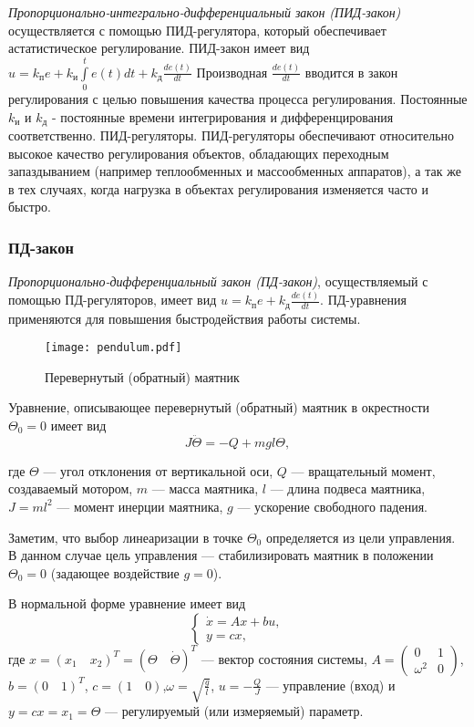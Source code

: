 \documentclass[TAU.tex]{subfiles}
\begin{document}
{\it Пропорционально-интегрально-дифференциальный закон (ПИД-закон)} осуществляется с помощью ПИД-регулятора, который обеспечивает астатистическое регулирование. ПИД-закон имеет вид $u=k_\text{п}e+ k_\text{и}\int\limits_0^t e(t) dt +k_\text{д} \frac{de(t)}{dt}$ Производная $\frac{d e(t)}{dt}$ вводится в закон регулирования с целью повышения качества процесса регулирования. Постоянные $k_\text{и}$ и $k_\text{д}$ - постоянные времени интегрирования и дифференцирования соответственно. ПИД-регуляторы.
ПИД-регуляторы обеспечивают относительно высокое качество регулирования объектов, обладающих переходным запаздыванием (например теплообменных и массообменных аппаратов), а так же в тех случаях, когда нагрузка в объектах регулирования изменяется часто и быстро.


\subsubsection{ПД-закон}

{\it Пропорционально-дифференциальный закон (ПД-закон)}, осуществляемый с помощью ПД-регуляторов, имеет вид $u=k_\text{п}e+ k_\text{д} \frac{de(t)}{dt}$. ПД-уравнения применяются для повышения быстродействия работы системы.

\begin{figure}[h]
\centering
\texttt{[image: pendulum.pdf]}
\caption{Перевернутый (обратный) маятник}
\centering
\end{figure}

Уравнение, описывающее перевернутый (обратный) маятник в окрестности $\Theta_0=0$ имеет вид
\begin{equation}\label{EQ1}
J\ddot\Theta = -Q+mgl\Theta,
\end{equation}
{\small где $\Theta$ --- угол отклонения от вертикальной оси, $Q$ --- вращательный момент, создаваемый мотором, $m$ --- масса маятника, $l$ --- длина подвеса
маятника, $J = ml^2$ --- момент инерции маятника, $g$ --- ускорение свободного падения.

Заметим, что выбор линеаризации в точке $\Theta_0$ определяется из цели управления. В данном случае цель управления --- стабилизировать маятник в положении $\Theta_0 = 0$ (задающее воздействие $g = 0$).
}

В нормальной форме уравнение  имеет вид
\begin{equation}\label{EQ1NORM}
\begin{cases}
\dot x = Ax + bu,\\
y = c x,
\end{cases}
\end{equation}
где $x = (x_1\quad x_2)^T = ( \Theta\quad \dot\Theta)^T$ --- вектор состояния системы, $A =\begin{pmatrix}0 & 1\\ \omega^2& 0\end{pmatrix}$,$b = (0\quad 1)^T$, $c = (1\quad0)$,$\omega = \sqrt{\frac{g}{l}}$, $u = -\frac{Q}{J}$ --- управление (вход) и $y = cx = x_1 = \Theta$ --- регулируемый (или измеряемый) параметр.
\end{document}
